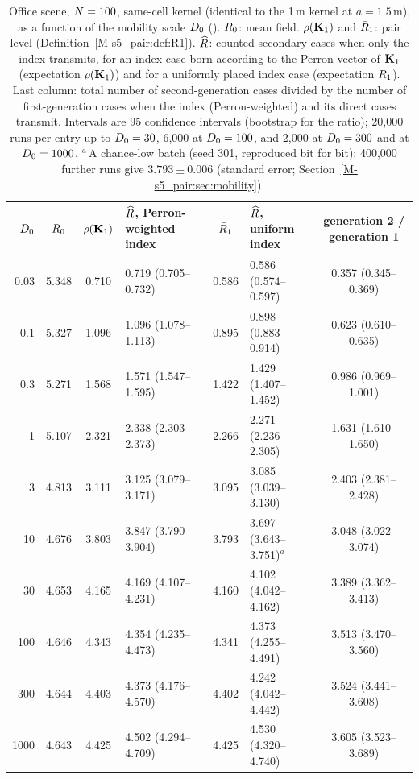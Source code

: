 \begin{table}[tbp]
\centering
\caption{Office scene, $N=100$, same-cell kernel (identical to the 1\,m kernel at $a=1.5$\,m), as a
function of the mobility scale $D_0$ (\cdunit). $R_0$: mean field. $\rho(\mathbf{K}_1)$ and
$\bar{R}_1$: pair level (Definition~\ref{M-s5_pair:def:R1}). $\widehat{R}$: counted secondary cases when only the
index transmits, for an index case born according to the Perron vector of $\mathbf{K}_1$ (expectation
$\rho(\mathbf{K}_1)$) and for a uniformly placed index case (expectation $\bar{R}_1$). Last column: total number of
second-generation cases divided by the number of first-generation cases when the index (Perron-weighted) and
its direct cases transmit. Intervals are 95\pct{} confidence intervals (bootstrap for the ratio); 20{,}000
runs per entry up to $D_0=30$, 6{,}000 at $D_0=100$, and 2{,}000 at $D_0=300$ and at $D_0=1000$.
$^{a}$\,A chance-low batch (seed 301, reproduced bit for bit): 400{,}000 further runs give $3.793\pm0.006$
(standard error; Section~\ref{M-s5_pair:sec:mobility}).}
\label{s5_pair:tab:mobility}
\footnotesize
\setlength{\tabcolsep}{4pt}
\begin{tabular}{rcclclc}
\toprule
$D_0$ & $R_0$ & $\rho(\mathbf{K}_1)$ & $\widehat{R}$, Perron-weighted index & $\bar{R}_1$ & $\widehat{R}$, uniform index &
generation 2 / generation 1\\
\midrule
0.03 & 5.348 & 0.710 & 0.719 (0.705--0.732) & 0.586 & 0.586 (0.574--0.597) & 0.357 (0.345--0.369)\\
0.1  & 5.327 & 1.096 & 1.096 (1.078--1.113) & 0.895 & 0.898 (0.883--0.914) & 0.623 (0.610--0.635)\\
0.3  & 5.271 & 1.568 & 1.571 (1.547--1.595) & 1.422 & 1.429 (1.407--1.452) & 0.986 (0.969--1.001)\\
1    & 5.107 & 2.321 & 2.338 (2.303--2.373) & 2.266 & 2.271 (2.236--2.305) & 1.631 (1.610--1.650)\\
3    & 4.813 & 3.111 & 3.125 (3.079--3.171) & 3.095 & 3.085 (3.039--3.130) & 2.403 (2.381--2.428)\\
10   & 4.676 & 3.803 & 3.847 (3.790--3.904) & 3.793 & 3.697 (3.643--3.751)$^{a}$ & 3.048 (3.022--3.074)\\
30   & 4.653 & 4.165 & 4.169 (4.107--4.231) & 4.160 & 4.102 (4.042--4.162) & 3.389 (3.362--3.413)\\
100  & 4.646 & 4.343 & 4.354 (4.235--4.473) & 4.341 & 4.373 (4.255--4.491) & 3.513 (3.470--3.560)\\
300  & 4.644 & 4.403 & 4.373 (4.176--4.570) & 4.402 & 4.242 (4.042--4.442) & 3.524 (3.441--3.608)\\
1000 & 4.643 & 4.425 & 4.502 (4.294--4.709) & 4.425 & 4.530 (4.320--4.740) & 3.605 (3.523--3.689)\\
\bottomrule
\end{tabular}
\end{table}


